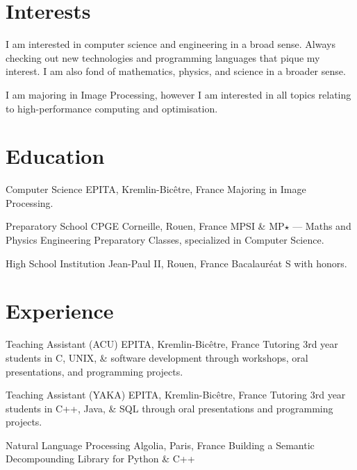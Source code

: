 \section{Interests}

I am interested in computer science and engineering in a broad sense. Always
checking out new technologies and programming languages that pique my interest.
I am also fond of mathematics, physics, and science in a broader sense.

I am majoring in Image Processing, however I am interested in all topics
relating to high-performance computing and optimisation.


\section{Education}

\begin{twenty} %

    {Computer Science}
    {EPITA, Kremlin-Bicêtre, France}
    {Majoring in Image Processing.}

    {Preparatory School}
    {CPGE Corneille, Rouen, France}
    {MPSI \& MP$\star$ --- Maths and Physics Engineering Preparatory Classes,
    specialized in Computer Science.}

    {High School}
    {Institution Jean-Paul II, Rouen, France}
    {Bacalauréat S with honors.}

\end{twenty}


\section{Experience}

\begin{twenty}

    {Teaching Assistant (ACU)}
    {EPITA, Kremlin-Bicêtre, France}
    {Tutoring 3rd year students in C, UNIX, \& software development through
    workshops, oral presentations, and programming projects.}

    {Teaching Assistant (YAKA)}
    {EPITA, Kremlin-Bicêtre, France}
    {Tutoring 3rd year students in C++, Java, \& SQL through oral presentations
    and programming projects.}

    {Natural Language Processing}
    {Algolia, Paris, France}
    {Building a Semantic Decompounding Library for Python \& C++}

\end{twenty}

